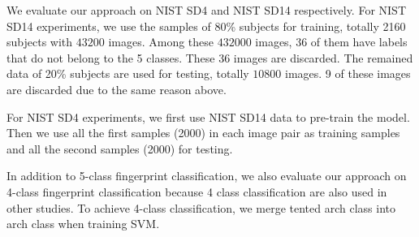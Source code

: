 We evaluate our approach on NIST SD4 and NIST SD14 respectively.
%
For NIST SD14 experiments, we use the samples of 80\% subjects for training, totally 2160 subjects with $43200$ images. Among these $432000$ images, 36 of them have labels that do not belong to the 5 classes. These 36 images are discarded. 
The remained data of 20\% subjects are used for testing, totally $10800$ images. 9 of these images are discarded due to the same reason above.
%

For NIST SD4 experiments, we first use NIST SD14 data to pre-train the model. Then we use all the first samples (2000) in each image pair as training samples and all the second samples (2000) for testing.
%


In addition to 5-class fingerprint classification, we also evaluate our approach on 4-class fingerprint classification because 4 class classification are also used in other studies. 
%
To achieve 4-class classification, we merge tented arch class into arch class when training SVM.

